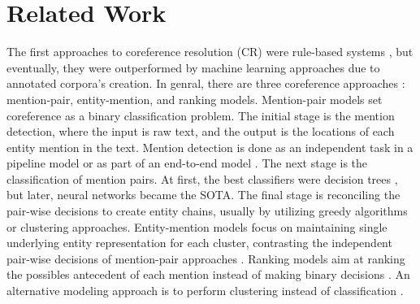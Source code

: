 \documentclass[11pt]{article}
\begin{document}
\section{Related Work} 
\label{sec:coreference:rel}
The first approaches to coreference resolution (CR) were rule-based systems \cite{lappin-leass-1994-algorithm, manning-etal-2014-stanford}, but eventually, they were outperformed by machine learning approaches \cite{aone-william-1995-evaluating, mccarthy1995using, Mitkov2002} due to annotated corpora's creation. In genral, there are three coreference approaches : mention-pair, entity-mention, and ranking models.
Mention-pair models set coreference as a binary classification problem. 
The initial stage is the mention detection, where the input is raw text, and the output is the locations of each entity mention in the text. Mention detection is done as an independent task in a pipeline model \cite{soon-etal-2001-machine} or as part of an end-to-end model \cite{lee-etal-2017-end}. The next stage is the classification of mention pairs. At first, the best classifiers were decision trees \cite{soon-etal-2001-machine, mccarthy1995using, aone-william-1995-evaluating}, but later, neural networks became the SOTA. The final stage is reconciling the pair-wise decisions to create entity chains, usually by utilizing greedy algorithms or clustering approaches. 
Entity-mention models focus on maintaining single underlying entity representation for each cluster, contrasting the independent pair-wise decisions of mention-pair approaches \cite{clark-manning-2015-entity, clark-manning-2016-improving}. 
Ranking models aim at ranking the possibles antecedent of each mention instead of making binary decisions \cite{wiseman-etal-2016-learning}. An alternative modeling approach is to perform clustering instead of classification \cite{fernandes-etal-2012-latent}. 
\end{document}
